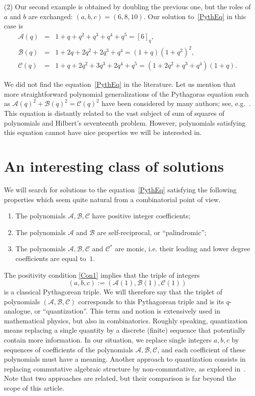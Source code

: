 \documentclass{article}[12pt]
\theoremstyle{plain}
\theoremstyle{definition}
\newcommand{\A}{\mathcal{A}}
\newcommand{\B}{\mathcal{B}}
\newcommand{\cC}{\mathcal{C}}
\begin{document}
(2)
Our second example is obtained by doubling the previous one,
but the roles of $a$ and $b$ are exchanged: $(a,b,c)=(6,8,10)$.
Our solution to~\eqref{PythEq} in this case is
\begin{eqnarray*}
\A(q) &=& 1+q+q^2+q^3+q^4+q^5=\left[6\right]_q,
\\[4pt]
\B(q) &=& 1+2q+2q^2+2q^3+q^4=(1+q)(1+q^2)^2,
\\[4pt]
\cC(q) &=& 1+q+2q^2+3q^3+2q^4+q^5=(1+2q^2+q^3+q^4)(1+q).
\end{eqnarray*}

We did not find the equation~\eqref{PythEq} in the literature.
Let us mention that more straightforward polynomial generalizations of the Pythagoras equation
such as $\A(q)^2+\B(q)^2=\cC(q)^2$ have been considered by many authors; 
see, e.g.~\cite{DLS,CC}.
This equation is distantly related to the vast subject of sum of squares of polynomials
and Hilbert's seventeenth problem.
However, polynomials satisfying this equation cannot have nice properties 
we will be interested in.

\section{An interesting class of solutions}

We will search for solutions to the equation~\eqref{PythEq}
satisfying the following properties 
which seem quite natural from a combinatorial point of view.

\begin{enumerate}
\item
\label{Con1}
The polynomials $\A,\B,\cC$ have positive integer coefficients;

\item
\label{Con2}
The polynomials $\A$ and $\B$ are self-reciprocal, or ``palindromic'';

\item
\label{Con3}
The polynomials $\A,\B,\cC$ and $\cC^*$ are monic, 
i.e. their leading and lower degree coefficients are equal to~$1$.

\end{enumerate}

The positivity condition \ref{Con1} implies that the triple of integers 
$$
(a,b,c):=(\A(1),\B(1),\cC(1))
$$ 
is a classical Pythagorean triple.
We will therefore say that the triplet of polynomials $(\A,\B,\cC)$
corresponds to this Pythagorean triple
and is its $q$-analogue, or ``quantization''.
This term and notion is extensively used in mathematical physics, but also in combinatorics.
Roughly speaking, quantization means replacing a single quantity by a discrete
(finite) sequence that potentially contain more information.
In our situation, we replace single integers $a,b,c$ by sequences of coefficients
of the polynomials $\A,\B,\cC$, 
and each coefficient of these polynomials must have a meaning.
Another approach to quantization consists in replacing 
commutative algebraic structure by non-commutative, as explored in~\cite{AE}.
Note that two approaches are related, but their comparison is far beyond the scope of this article.
\end{document}
